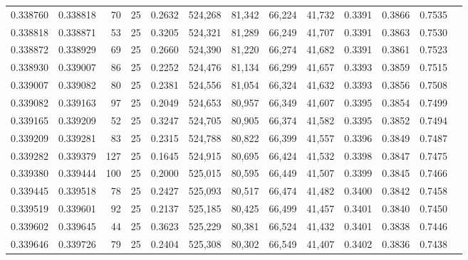 \begin{tabular}{rrrrrrrrrrrrr}
0.338760 & 0.338818 &    70 &  25 &                                     0.2632 & 524,268 &  81,342 &  66,224 &  41,732 & 0.3391 & 0.3866 & 0.7535 \\
0.338818 & 0.338871 &    53 &  25 &                                     0.3205 & 524,321 &  81,289 &  66,249 &  41,707 & 0.3391 & 0.3863 & 0.7530 \\
0.338872 & 0.338929 &    69 &  25 &                                     0.2660 & 524,390 &  81,220 &  66,274 &  41,682 & 0.3391 & 0.3861 & 0.7523 \\
0.338930 & 0.339007 &    86 &  25 &                                     0.2252 & 524,476 &  81,134 &  66,299 &  41,657 & 0.3393 & 0.3859 & 0.7515 \\
0.339007 & 0.339082 &    80 &  25 &                                     0.2381 & 524,556 &  81,054 &  66,324 &  41,632 & 0.3393 & 0.3856 & 0.7508 \\
0.339082 & 0.339163 &    97 &  25 &                                     0.2049 & 524,653 &  80,957 &  66,349 &  41,607 & 0.3395 & 0.3854 & 0.7499 \\
0.339165 & 0.339209 &    52 &  25 &                                     0.3247 & 524,705 &  80,905 &  66,374 &  41,582 & 0.3395 & 0.3852 & 0.7494 \\
0.339209 & 0.339281 &    83 &  25 &                                     0.2315 & 524,788 &  80,822 &  66,399 &  41,557 & 0.3396 & 0.3849 & 0.7487 \\
0.339282 & 0.339379 &   127 &  25 &                                     0.1645 & 524,915 &  80,695 &  66,424 &  41,532 & 0.3398 & 0.3847 & 0.7475 \\
0.339380 & 0.339444 &   100 &  25 &                                     0.2000 & 525,015 &  80,595 &  66,449 &  41,507 & 0.3399 & 0.3845 & 0.7466 \\
0.339445 & 0.339518 &    78 &  25 &                                     0.2427 & 525,093 &  80,517 &  66,474 &  41,482 & 0.3400 & 0.3842 & 0.7458 \\
0.339519 & 0.339601 &    92 &  25 &                                     0.2137 & 525,185 &  80,425 &  66,499 &  41,457 & 0.3401 & 0.3840 & 0.7450 \\
0.339602 & 0.339645 &    44 &  25 &                                     0.3623 & 525,229 &  80,381 &  66,524 &  41,432 & 0.3401 & 0.3838 & 0.7446 \\
0.339646 & 0.339726 &    79 &  25 &                                     0.2404 & 525,308 &  80,302 &  66,549 &  41,407 & 0.3402 & 0.3836 & 0.7438 \\

\end{tabular}
